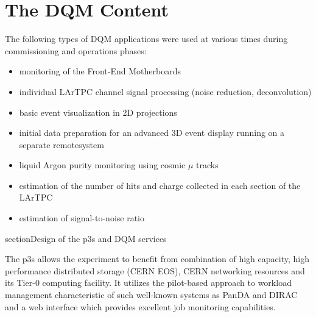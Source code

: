 \documentclass[pdftex,12pt,letter]{article}
\begin{document}
\section{The DQM Content}
The following types of DQM applications were used at various times during
commissioning and operations phases:
\begin{itemize}
\item monitoring of the Front-End Motherboards
\item individual LArTPC channel signal processing (noise reduction, deconvolution)
\item basic event visualization in 2D projections
\item initial data preparation for an advanced 3D event display running on a separate remotesystem
\item liquid Argon purity monitoring using cosmic $\mu$ tracks
\item estimation of the number of hits and charge collected in each section of the LArTPC
\item estimation of signal-to-noise ratio
\end{itemize}



section{Design of the p3s and DQM services}


The  p3s  allows the experiment to benefit from combination
of high capacity, high performance distributed storage (CERN EOS), CERN networking
resources and its Tier-0 computing facility. It utilizes  the pilot-based approach \cite{eps}
to workload management characteristic of such well-known systems as PanDA and
DIRAC \cite{panda,dirac} and a web interface which provides excellent job monitoring capabilities.
\end{document}

